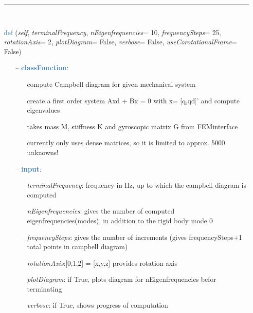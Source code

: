 \begin{itemize}[leftmargin=1.4cm]
\begin{itemize}[leftmargin=0.5cm]
\begin{itemize}[leftmargin=1.4cm]
\begin{itemize}[leftmargin=0.5cm]
%
\noindent\rule{8cm}{0.75pt}\vspace{1pt} \\ 
\begin{flushleft}
\noindent \textcolor{steelblue}{def {\bf {}}}\label{sec:FEM:FEMinterface:ComputeCampbellDiagram}
({\it self}, {\it terminalFrequency}, {\it nEigenfrequencies}= 10, {\it frequencySteps}= 25, {\it rotationAxis}= 2, {\it plotDiagram}= False, {\it verbose}= False, {\it useCorotationalFrame}= False)
\end{flushleft}
\setlength{\itemindent}{0.7cm}
\begin{itemize}[leftmargin=0.7cm]
  \item[--]  \textcolor{steelblue}{\bf classFunction}: \vspace{-6pt}
  \begin{itemize}[leftmargin=1.2cm]
\setlength{\itemindent}{-0.7cm}
    \item[] compute Campbell diagram for given mechanical system
    \item[] create a first order system Axd + Bx = 0 with x= [q,qd]' and compute eigenvalues
    \item[] takes mass M, stiffness K and gyroscopic matrix G from FEMinterface
    \item[] currently only uses dense matrices, so it is limited to approx. 5000 unknowns!
  \end{itemize}
  \item[--]  \textcolor{steelblue}{\bf input}: \vspace{-6pt}
  \begin{itemize}[leftmargin=1.2cm]
\setlength{\itemindent}{-0.7cm}
    \item[] {\it terminalFrequency}: frequency in Hz, up to which the campbell diagram is computed
    \item[] {\it   nEigenfrequencies}: gives the number of computed eigenfrequencies(modes), in addition to the rigid body mode 0
    \item[] {\it   frequencySteps}: gives the number of increments (gives frequencySteps+1 total points in campbell diagram)
    \item[] {\it   rotationAxis}:[0,1,2] = [x,y,z] provides rotation axis
    \item[] {\it   plotDiagram}: if True, plots diagram for nEigenfrequencies befor terminating
    \item[] {\it   verbose}: if True, shows progress of computation

\end{itemize}
\end{itemize}
\end{itemize}
\end{itemize}
\end{itemize}
\end{itemize}
